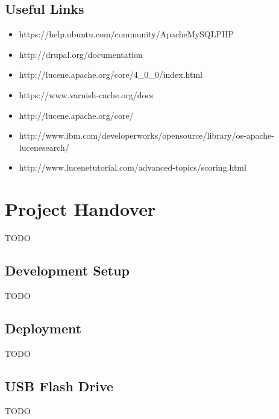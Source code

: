 \documentclass[11pt]{article} %
\begin{document}
\subsection{Useful Links}

\begin{itemize}
\item https://help.ubuntu.com/community/ApacheMySQLPHP
\item http://drupal.org/documentation
\item http://lucene.apache.org/core/4\_0\_0/index.html
\item https://www.varnish-cache.org/docs
\item http://lucene.apache.org/core/
\item http://www.ibm.com/developerworks/opensource/library/os-apache-lucenesearch/
\item http://www.lucenetutorial.com/advanced-topics/scoring.html
\end{itemize}

\section{Project Handover}

TODO

\subsection{Development Setup}

TODO

\subsection{Deployment}

TODO

\subsection{USB Flash Drive}

TODO
\end{document}

